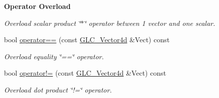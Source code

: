\begin{Indent}{\bf Operator Overload}
\begin{DoxyCompactItemize}
\begin{DoxyCompactList}\small\item\em Overload scalar product \char`\"{}$\ast$\char`\"{} operator between 1 vector and one scalar. \end{DoxyCompactList}\item 
bool \hyperlink{class_g_l_c___vector4d_a13be2cb7c364f7cfa8a1dd745f4fa8ad}{operator==} (const \hyperlink{class_g_l_c___vector4d}{G\-L\-C\-\_\-\-Vector4d} \&Vect) const 
\begin{DoxyCompactList}\small\item\em Overload equality \char`\"{}==\char`\"{} operator. \end{DoxyCompactList}\item 
bool \hyperlink{class_g_l_c___vector4d_a28c9622cfdc7ed2f24ffff28a5f83303}{operator!=} (const \hyperlink{class_g_l_c___vector4d}{G\-L\-C\-\_\-\-Vector4d} \&Vect) const 
\begin{DoxyCompactList}\small\item\em Overload dot product \char`\"{}!=\char`\"{} operator. \end{DoxyCompactList}\end{DoxyCompactItemize}
\end{Indent}

